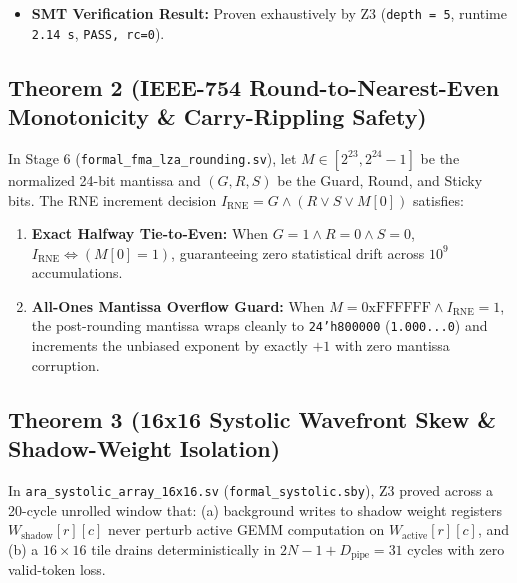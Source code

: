 \documentclass[journal,10pt,twocolumn]{IEEEtran}
\begin{document}
\begin{itemize}
  \item \textbf{SMT Verification Result:} Proven exhaustively by Z3 (\texttt{depth = 5}, runtime \texttt{2.14 s}, \texttt{PASS, rc=0}).
\end{itemize}

\subsection{Theorem 2 (IEEE-754 Round-to-Nearest-Even Monotonicity \& Carry-Rippling Safety)}
In Stage 6 (\texttt{formal\_fma\_lza\_rounding.sv}), let $M \in [2^{23}, 2^{24}-1]$ be the normalized 24-bit mantissa and $(G, R, S)$ be the Guard, Round, and Sticky bits. The RNE increment decision $I_{\mathrm{RNE}} = G \wedge (R \vee S \vee M[0])$ satisfies:
\begin{enumerate}
  \item \textbf{Exact Halfway Tie-to-Even:} When $G=1 \wedge R=0 \wedge S=0$, $I_{\mathrm{RNE}} \iff (M[0] = 1)$, guaranteeing zero statistical drift across $10^9$ accumulations.
  \item \textbf{All-Ones Mantissa Overflow Guard:} When $M = \mathrm{0xFFFFFF} \wedge I_{\mathrm{RNE}} = 1$, the post-rounding mantissa wraps cleanly to \texttt{24'h800000} (\texttt{1.000...0}) and increments the unbiased exponent by exactly $+1$ with zero mantissa corruption.
\end{enumerate}

\subsection{Theorem 3 (16x16 Systolic Wavefront Skew \& Shadow-Weight Isolation)}
In \texttt{ara\_systolic\_array\_16x16.sv} (\texttt{formal\_systolic.sby}), Z3 proved across a 20-cycle unrolled window that: (a) background writes to shadow weight registers $W_{\mathrm{shadow}}[r][c]$ never perturb active GEMM computation on $W_{\mathrm{active}}[r][c]$, and (b) a $16 \times 16$ tile drains deterministically in $2N - 1 + D_{\mathrm{pipe}} = 31$ cycles with zero valid-token loss.
\end{document}
